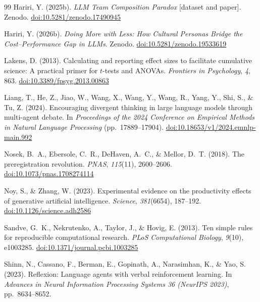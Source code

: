 \documentclass[12pt,a4paper]{article}
\begin{document}
\begin{thebibliography}{99}
Hariri, Y. (2025b).
\textit{LLM Team Composition Paradox} [dataset and paper]. Zenodo.
\href{https://doi.org/10.5281/zenodo.17490945}{doi:10.5281/zenodo.17490945}

Hariri, Y. (2026b).
\textit{Doing More with Less: How Cultural Personas Bridge the Cost--Performance
  Gap in LLMs}. Zenodo.
\href{https://doi.org/10.5281/zenodo.19533619}{doi:10.5281/zenodo.19533619}

Lakens, D. (2013).
Calculating and reporting effect sizes to facilitate cumulative science: A
  practical primer for $t$-tests and ANOVAs.
\textit{Frontiers in Psychology}, \textit{4}, 863.
\href{https://doi.org/10.3389/fpsyg.2013.00863}{doi:10.3389/fpsyg.2013.00863}

Liang, T., He, Z., Jiao, W., Wang, X., Wang, Y., Wang, R., Yang, Y., Shi, S.,
  \& Tu, Z. (2024).
Encouraging divergent thinking in large language models through multi-agent
  debate.
In \textit{Proceedings of the 2024 Conference on Empirical Methods in Natural
  Language Processing} (pp.~17889--17904).
\href{https://doi.org/10.18653/v1/2024.emnlp-main.992}{doi:10.18653/v1/2024.emnlp-main.992}

Nosek, B.~A., Ebersole, C.~R., DeHaven, A.~C., \& Mellor, D.~T. (2018).
The preregistration revolution.
\textit{PNAS}, \textit{115}(11), 2600--2606.
\href{https://doi.org/10.1073/pnas.1708274114}{doi:10.1073/pnas.1708274114}

Noy, S., \& Zhang, W. (2023).
Experimental evidence on the productivity effects of generative artificial
  intelligence.
\textit{Science}, \textit{381}(6654), 187--192.
\href{https://doi.org/10.1126/science.adh2586}{doi:10.1126/science.adh2586}

Sandve, G.~K., Nekrutenko, A., Taylor, J., \& Hovig, E. (2013).
Ten simple rules for reproducible computational research.
\textit{PLoS Computational Biology}, \textit{9}(10), e1003285.
\href{https://doi.org/10.1371/journal.pcbi.1003285}{doi:10.1371/journal.pcbi.1003285}

Shinn, N., Cassano, F., Berman, E., Gopinath, A., Narasimhan, K., \& Yao, S.
  (2023).
Reflexion: Language agents with verbal reinforcement learning.
In \textit{Advances in Neural Information Processing Systems 36 (NeurIPS 2023)},
  pp.~8634--8652.


\end{thebibliography}
\end{document}
